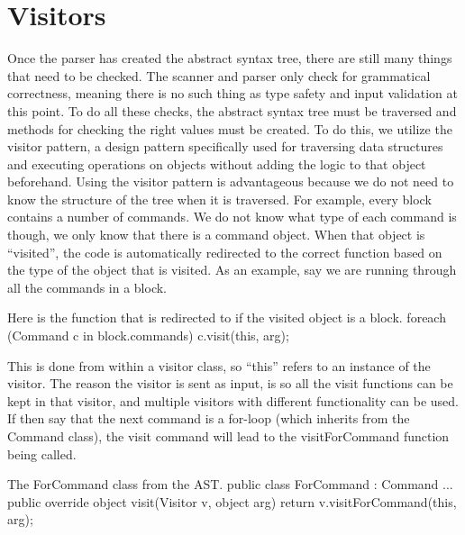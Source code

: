 \section{Visitors}
Once the parser has created the abstract syntax tree, there are still many things that need to be checked. 
The scanner and parser only check for grammatical correctness, meaning there is no such thing as type safety and input validation at this point. \newline
To do all these checks, the abstract syntax tree must be traversed and methods for checking the right values must be created. 
To do this, we utilize the visitor pattern, a design pattern specifically used for traversing data structures and executing operations on objects without adding the logic to that object beforehand. \newline
Using the visitor pattern is advantageous because we do not need to know the structure of the tree when it is traversed.
For example, every block contains a number of commands. 
We do not know what type of each command is though, we only know that there is a command object. 
When that object is "`visited"', the code is automatically redirected to the correct function based on the type of the object that is visited. \newline\newline
As an example, say we are running through all the commands in a block.
\newline
\begin{source}{Here is the function that is redirected to if the visited object is a block.}{}
foreach (Command c in block.commands)
  {
		c.visit(this, arg);
	}
\end{source}
\newline
This is done from within a visitor class, so "`this"' refers to an instance of the visitor. 
The reason the visitor is sent as input, is so all the visit functions can be kept in that visitor, and multiple visitors with different functionality can be used.
If then say that the next command is a for-loop (which inherits from the Command class), the visit command will lead to the visitForCommand function being called.
\newline
\begin{source}{The ForCommand class from the AST.}{}
public class ForCommand : Command
    {
        ...
        public override object visit(Visitor v, object arg)
        {
            return v.visitForCommand(this, arg);
        }
    }
\end{source}
\newline
